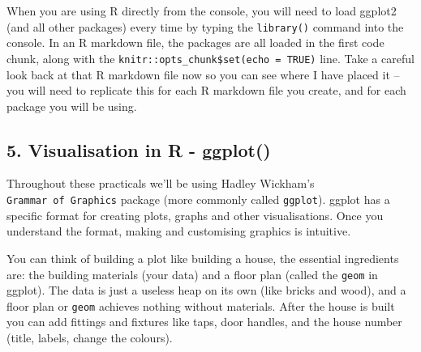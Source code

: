 \documentclass[]{article}
\begin{document}
When you are using R directly from the console, you will need to load
ggplot2 (and all other packages) every time by typing the
\texttt{library()} command into the console. In an R markdown file, the
packages are all loaded in the first code chunk, along with the
\texttt{knitr::opts\_chunk\$set(echo\ =\ TRUE)} line. Take a careful
look back at that R markdown file now so you can see where I have placed
it -- you will need to replicate this for each R markdown file you
create, and for each package you will be using.

\hypertarget{visualisation-in-r---ggplot}{%
\subsection{5. Visualisation in R -
ggplot()}\label{visualisation-in-r---ggplot}}

Throughout these practicals we'll be using Hadley Wickham's
\texttt{Grammar\ of\ Graphics} package (more commonly called
\texttt{ggplot}). ggplot has a specific format for creating plots,
graphs and other visualisations. Once you understand the format, making
and customising graphics is intuitive.

You can think of building a plot like building a house, the essential
ingredients are: the building materials (your data) and a floor plan
(called the \texttt{geom} in ggplot). The data is just a useless heap on
its own (like bricks and wood), and a floor plan or \texttt{geom}
achieves nothing without materials. After the house is built you can add
fittings and fixtures like taps, door handles, and the house number
(title, labels, change the colours).
\end{document}
